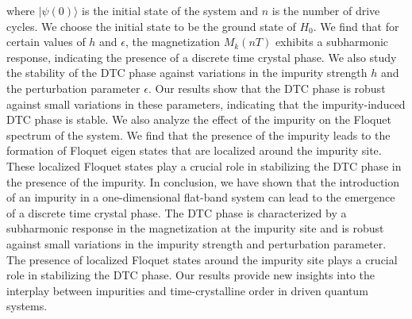 \documentclass[a4paper, 11pt]{article}
\begin{document}
where $|\psi(0)\rangle$ is the initial state of the system and $n$ is the number of drive cycles. We choose the initial state to be the ground state of $H_{0}$. We find that for certain values of $h$ and $\epsilon$, the magnetization $M_{k}(nT)$ exhibits a subharmonic response, indicating the presence of a discrete time crystal phase. We also study the stability of the DTC phase against variations in the impurity strength $h$ and the perturbation parameter $\epsilon$. Our results show that the DTC phase is robust against small variations in these parameters, indicating that the impurity-induced DTC phase is stable. We also analyze the effect of the impurity on the Floquet spectrum of the system. We find that the presence of the impurity leads to the formation of Floquet eigen  states that are localized around the impurity site. These localized Floquet states play a crucial role in stabilizing the DTC phase in the presence of the impurity. In conclusion, we have shown that the introduction of an impurity in a one-dimensional flat-band system can lead to the emergence of a discrete time crystal phase. The DTC phase is characterized by a subharmonic response in the magnetization at the impurity site and is robust against small variations in the impurity strength and perturbation parameter. The presence of localized Floquet states around the impurity site plays a crucial role in stabilizing the DTC phase. Our results provide new insights into the interplay between impurities and time-crystalline order in driven quantum systems.       


\vspace{2cm}
\nocite{*}
\printbibliography{}
\end{document}
